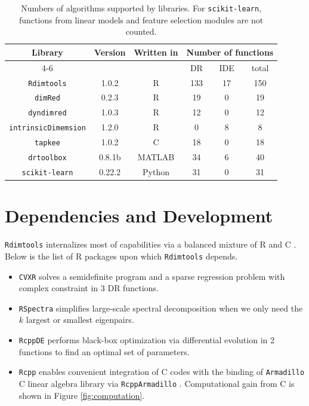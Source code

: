 \documentclass[twoside,11pt]{article}
\newcommand\cpp{C\nolinebreak[4]\hspace{-.05em}\raisebox{.4ex}{\relsize{-3}{\textbf{++}}} }
\newcommand{\Rdimtools}{\texttt{Rdimtools} }
\begin{document}
\begin{table}[h]
	\centering
	\begin{tabular}{|c|c|c|c|c|c|}
		\hline
		\multirow{2}{*}{Library} & \multirow{2}{*}{Version} & \multirow{2}{*}{Written in} & \multicolumn{3}{c|}{Number of functions}           \\ \cline{4-6} 
		&                          &                             & DR & IDE & total \\ \hline \hline
		\texttt{Rdimtools} & 1.0.2 & R & 133 & 17 & 150 \\ \hline 
		\texttt{dimRed} & 0.2.3 & R & 19 & 0 & 19 \\ \hline
		\texttt{dyndimred} & 1.0.3 & R & 12 & 0 & 12 \\ \hline
		\texttt{intrinsicDimemsion} & 1.2.0 & R & 0 & 8 & 8 \\ \hline
		\texttt{tapkee} & 1.0.2 & \cpp & 18 & 0 & 18 \\ \hline
		\texttt{drtoolbox} & 0.8.1b & MATLAB & 34 & 6 & 40 \\ \hline 
		\texttt{scikit-learn} & 0.22.2 & Python & 31 & 0 & 31 \\ \hline		
	\end{tabular}
	\caption{Numbers of algorithms supported by libraries. For \texttt{scikit-learn}, functions from linear models and feature selection modules are not counted.}
	\label{tab:comparison}
\end{table}

\section{Dependencies and Development}
\Rdimtools internalizes most of capabilities via a balanced mixture of R and \cpp. Below is the list of R packages upon which \Rdimtools depends.
\begin{itemize}
	\item \texttt{CVXR} \citep{fu_cvxr_2018} solves a semidefinite program and a sparse regression problem with complex constraint in 3 DR functions.
	\item \texttt{RSpectra} \citep{qiu_rspectra_2019} simplifies large-scale spectral decomposition when we only need the $k$ largest or smallest eigenpairs. 
	\item \texttt{RcppDE} \citep{eddelbuettel_rcppde_2018} performs black-box optimization via differential evolution in 2 functions to find an optimal set of parameters. 
	\item \texttt{Rcpp} \citep{eddelbuettel_rcpp_2011, eddelbuettel_seamless_2013} enables convenient integration of \cpp codes with the binding of \texttt{Armadillo} \cpp linear algebra library \citep{sanderson_armadillo_2016a} via \texttt{RcppArmadillo} \citep{eddelbuettel_rcpparmadillo_2014a}. Computational gain from \cpp is shown in Figure \ref{fig:computation}.
\end{itemize}
\end{document}
